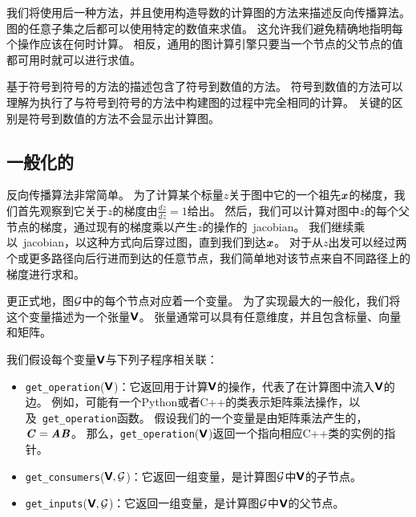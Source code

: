 我们将使用后一种方法，并且使用构造导数的计算图的方法来描述反向传播算法。
图的任意子集之后都可以使用特定的数值来求值。
这允许我们避免精确地指明每个操作应该在何时计算。
相反，通用的图计算引擎只要当一个节点的父节点的值都可用时就可以进行求值。

  
基于符号到符号的方法的描述包含了符号到数值的方法。
符号到数值的方法可以理解为执行了与符号到符号的方法中构建图的过程中完全相同的计算。
关键的区别是符号到数值的方法不会显示出计算图。

\subsection{一般化的}
\label{sec:general_back_propagation}

反向传播算法非常简单。
为了计算某个标量$z$关于图中它的一个祖先$\boldsymbol{\mathit{x}}$的梯度，我们首先观察到它关于$z$的梯度由$\frac{dz}{dz}=1$给出。
然后，我们可以计算对图中$z$的每个父节点的梯度，通过现有的梯度乘以产生$z$的操作的~\gls{jacobian}。
我们继续乘以~\gls{jacobian}，以这种方式向后穿过图，直到我们到达$\boldsymbol{\mathit{x}}$。
对于从$z$出发可以经过两个或更多路径向后行进而到达的任意节点，我们简单地对该节点来自不同路径上的梯度进行求和。

更正式地，图$\mathcal{G}$中的每个节点对应着一个变量。
为了实现最大的一般化，我们将这个变量描述为一个张量$\textsf{\textbf{V}}$。
张量通常可以具有任意维度，并且包含标量、向量和矩阵。

我们假设每个变量$\textsf{\textbf{V}}$与下列子程序相关联：
\begin{itemize}
    \item \verb|get_operation|($\textsf{\textbf{V}}$)：它返回用于计算$\textsf{\textbf{V}}$的操作，代表了在计算图中流入$\textsf{\textbf{V}}$的边。
    例如，可能有一个Python或者C++的类表示矩阵乘法操作，以及~\verb|get_operation|函数。
    假设我们的一个变量是由矩阵乘法产生的，$\boldsymbol{\mathit{C}}=\boldsymbol{\mathit{A}}\boldsymbol{\mathit{B}}$。
    那么，\verb|get_operation|($\textsf{\textbf{V}}$)返回一个指向相应C++类的实例的指针。

    \item \verb|get_consumers|($\textsf{\textbf{V}}, \mathcal{G}$)：它返回一组变量，是计算图$\mathcal{G}$中$\textsf{\textbf{V}}$的子节点。

    \item \verb|get_inputs|($\textsf{\textbf{V}}, \mathcal{G}$)：它返回一组变量，是计算图$\mathcal{G}$中$\textsf{\textbf{V}}$的父节点。
\end{itemize}

  
